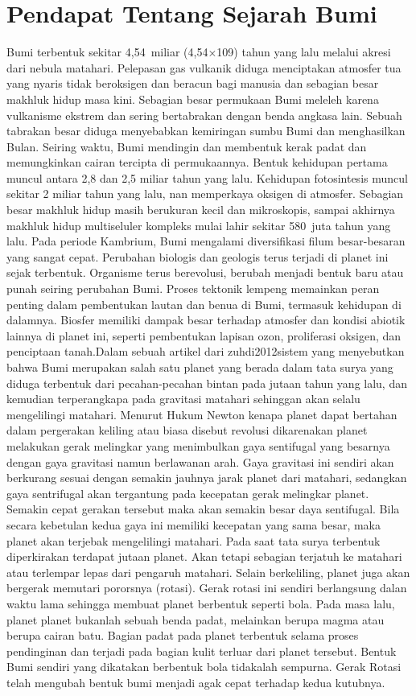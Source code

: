 \section{Pendapat Tentang Sejarah Bumi}
Bumi terbentuk sekitar 4,54 miliar (4,54×109) tahun yang lalu melalui akresi dari nebula matahari. Pelepasan gas vulkanik diduga menciptakan atmosfer tua yang nyaris tidak beroksigen dan beracun bagi manusia dan sebagian besar makhluk hidup masa kini. Sebagian besar permukaan Bumi meleleh karena vulkanisme ekstrem dan sering bertabrakan dengan benda angkasa lain. Sebuah tabrakan besar diduga menyebabkan kemiringan sumbu Bumi dan menghasilkan Bulan. Seiring waktu, Bumi mendingin dan membentuk kerak padat dan memungkinkan cairan tercipta di permukaannya. Bentuk kehidupan pertama muncul antara 2,8 dan 2,5 miliar tahun yang lalu. Kehidupan fotosintesis muncul sekitar 2 miliar tahun yang lalu, nan memperkaya oksigen di atmosfer. Sebagian besar makhluk hidup masih berukuran kecil dan mikroskopis, sampai akhirnya makhluk hidup multiseluler kompleks mulai lahir sekitar 580 juta tahun yang lalu. Pada periode Kambrium, Bumi mengalami diversifikasi filum besar-besaran yang sangat cepat. Perubahan biologis dan geologis terus terjadi di planet ini sejak terbentuk. Organisme terus berevolusi, berubah menjadi bentuk baru atau punah seiring perubahan Bumi. Proses tektonik lempeng memainkan peran penting dalam pembentukan lautan dan benua di Bumi, termasuk kehidupan di dalamnya. Biosfer memiliki dampak besar terhadap atmosfer dan kondisi abiotik lainnya di planet ini, seperti pembentukan lapisan ozon, proliferasi oksigen, dan penciptaan tanah.Dalam sebuah artikel dari zuhdi2012sistem yang menyebutkan bahwa Bumi merupakan salah satu planet yang berada dalam tata surya yang diduga terbentuk dari pecahan-pecahan bintan pada jutaan tahun yang lalu, dan kemudian terperangkapa pada gravitasi matahari sehinggan akan selalu mengelilingi matahari. Menurut Hukum Newton kenapa planet dapat bertahan dalam pergerakan keliling atau biasa disebut revolusi dikarenakan planet melakukan gerak melingkar yang menimbulkan gaya sentifugal yang besarnya  dengan gaya gravitasi namun berlawanan arah. Gaya gravitasi ini sendiri akan berkurang sesuai dengan semakin jauhnya jarak planet dari matahari, sedangkan gaya sentrifugal  akan tergantung pada kecepatan gerak melingkar planet. Semakin cepat gerakan tersebut maka akan semakin besar daya sentifugal. Bila secara kebetulan kedua gaya ini memiliki kecepatan yang sama besar, maka planet akan terjebak mengelilingi matahari. Pada saat tata surya terbentuk diperkirakan terdapat jutaan planet. Akan tetapi sebagian terjatuh ke matahari atau terlempar lepas dari pengaruh matahari. Selain berkeliling, planet juga akan bergerak memutari pororsnya (rotasi). Gerak rotasi ini sendiri berlangsung dalan waktu lama sehingga membuat planet berbentuk seperti bola. Pada masa lalu, planet planet bukanlah sebuah benda padat, melainkan berupa magma atau berupa cairan batu. Bagian padat pada planet terbentuk selama proses pendinginan dan terjadi pada bagian kulit terluar dari planet tersebut. Bentuk Bumi sendiri yang dikatakan berbentuk bola tidakalah sempurna. Gerak Rotasi telah mengubah bentuk bumi menjadi agak cepat terhadap kedua kutubnya.\cite{zuhdi2012sistem}


